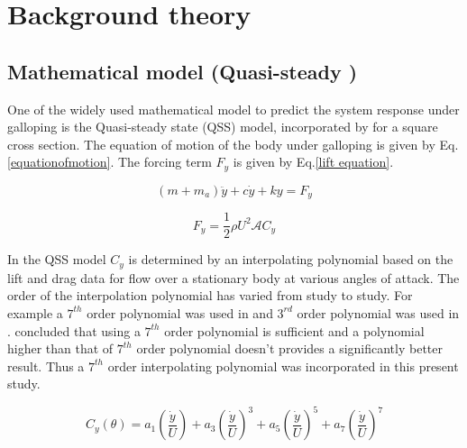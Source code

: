 
\section{Background theory}

\subsection{Mathematical model (Quasi-steady )}

 One of the widely used mathematical model to predict the system response under galloping is the Quasi-steady state (QSS) model, incorporated by \cite{Parkinson1964} for a square cross section. The equation of motion of the body under galloping is given by Eq.\eqref{equationofmotion}. The forcing term $F_y$ is given by Eq.\eqref{lift equation}.
 
 

\begin{equation}
\label{equationofmotion}
(m+m_a)\ddot{y}+c\dot{y}+ky=F_y
\end{equation}

\begin{equation}
\label{lift equation}
F_y=\frac{1}{2}\rho U^2\mathcal{A}C_y
\end{equation}

 In the QSS  model $C_y$ is determined by an interpolating polynomial based on the lift and drag data  for flow over a stationary body at various angles of attack. The order of the interpolation polynomial has varied from study to study. For  example a $7^{th}$ order polynomial was used in \cite{Parkinson1964} and $3^{rd}$ order polynomial was used in \cite{Barrero-Gil2009}. \cite{Ng2005} concluded that using a $7^{th}$ order polynomial is sufficient and a polynomial higher than that of $7^{th}$ order polynomial doesn't provides a significantly better result. Thus a $7 ^{th}$ order interpolating polynomial was incorporated in this present study. 

\begin{equation}
\label{cy ploynomial}
C_y(\theta)=a_1\left(\frac{\dot{y}}{U}\right)+a_3\left(\frac{\dot{y}}{U}\right)^3+a_5\left(\frac{\dot{y}}{U}\right)^5+a_7\left(\frac{\dot{y}}{U}\right)^7
\end{equation}


